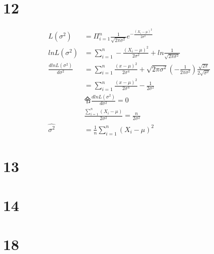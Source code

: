 \documentclass[a4paper,twocolumn]{ctexart}
\begin{document}
\section*{12}
\begin{align*}
L(\sigma^2)&=\Pi_{i=1}^{n}\frac{1}{\sqrt{2\pi\sigma^2}}e^{-\frac{(X_i-\mu)^2}{2\sigma^2}}\\
lnL(\sigma^2)&=\sum_{i=1}^{n}-\frac{(X_i-\mu)^2}{2\sigma^2}+ln\frac{1}{\sqrt{2\pi\sigma^2}}\\
\frac{dlnL(\sigma^2)}{d\sigma^2}&=\sum_{i=1}^{n}\frac{(x-\mu)^2}{2\sigma^4}+\sqrt{2\pi \sigma^2}(-\frac{1}{2\pi\sigma^2})\frac{\sqrt{2\pi}}{2\sqrt{\sigma^2}}\\
&=\sum_{i=1}^{n}\frac{(x-\mu)^2}{2\sigma^4}-\frac{1}{2\sigma^2}\\
&\text{令}\frac{dlnL(\sigma^2)}{d\sigma^2}=0\\
&\frac{\sum_{i=1}^{n}(X_i-\mu)}{2\sigma^2}=\frac{n}{2\sigma^2}\\
\hat{\sigma^2}&=\frac{1}{n}\sum_{i=1}^{n}(X_i-\mu)^2
\end{align*}
\section*{13}
\section*{14}
\section*{18}
\end{document}
